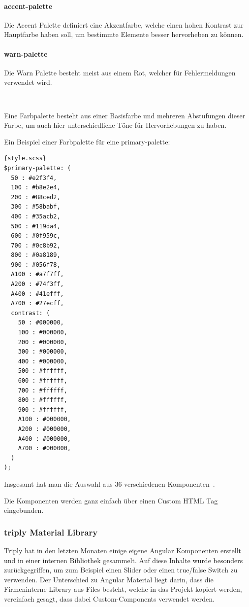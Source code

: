 \paragraph{accent-palette}
Die Accent Palette definiert eine Akzentfarbe, welche einen hohen Kontrast zur Hauptfarbe haben soll, um bestimmte Elemente
besser hervorheben zu können.

\paragraph{warn-palette}
Die Warn Palette besteht meist aus einem Rot, welcher für Fehlermeldungen verwendet wird.

~
\linebreak ~
\linebreak ~
\linebreak ~

Eine Farbpalette besteht aus einer Basisfarbe und mehreren Abstufungen dieser Farbe, um auch hier unterschiedliche Töne für
Hervorhebungen zu haben.

Ein Beispiel einer Farbpalette für eine primary-palette:

\begin{lstlisting}[label={lst:custom-primary-color-palette}]{style.scss}
$primary-palette: (
  50 : #e2f3f4,
  100 : #b8e2e4,
  200 : #88ced2,
  300 : #58babf,
  400 : #35acb2,
  500 : #119da4,
  600 : #0f959c,
  700 : #0c8b92,
  800 : #0a8189,
  900 : #056f78,
  A100 : #a7f7ff,
  A200 : #74f3ff,
  A400 : #41efff,
  A700 : #27ecff,
  contrast: (
    50 : #000000,
    100 : #000000,
    200 : #000000,
    300 : #000000,
    400 : #000000,
    500 : #ffffff,
    600 : #ffffff,
    700 : #ffffff,
    800 : #ffffff,
    900 : #ffffff,
    A100 : #000000,
    A200 : #000000,
    A400 : #000000,
    A700 : #000000,
  )
);
\end{lstlisting}

Insgesamt hat man die Auswahl aus 36 verschiedenen Komponenten~\cite{angular-material-component-overview,angular-material-description,angular-material-with-angular}.

Die Komponenten werden ganz einfach über einen Custom HTML Tag eingebunden.

\subsubsection{triply Material Library}
Triply hat in den letzten Monaten einige eigene Angular Komponenten erstellt und in einer internen Bibliothek gesammelt.
Auf diese Inhalte wurde besonders zurückgegriffen, um zum Beispiel einen Slider oder einen true/false Switch
zu verwenden.
Der Unterschied zu Angular Material liegt darin, dass die Firmeninterne Library aus Files besteht, welche in das Projekt
kopiert werden, vereinfach gesagt, dass dabei Custom-Components verwendet werden.

